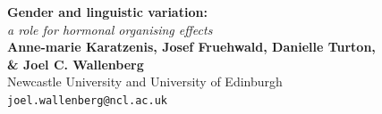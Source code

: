 \documentclass[a0,portrait]{a0poster}
\begin{document}


\begin{minipage}[b]{0.70\linewidth}
\veryHuge \color{NavyBlue} \textbf{Gender and linguistic variation:} \color{Black}\\ %
\Huge\textit{a role for hormonal organising effects}\\[2cm] %
\huge \textbf{Anne-marie Karatzenis, Josef Fruehwald, Danielle Turton, \vspace*{5mm}\\\& Joel C. Wallenberg}\\[0.5cm] %
\huge Newcastle University and University of Edinburgh \\[0.4cm] %
\Large \texttt{joel.wallenberg@ncl.ac.uk}\\
\end{minipage}
%
\end{document}
